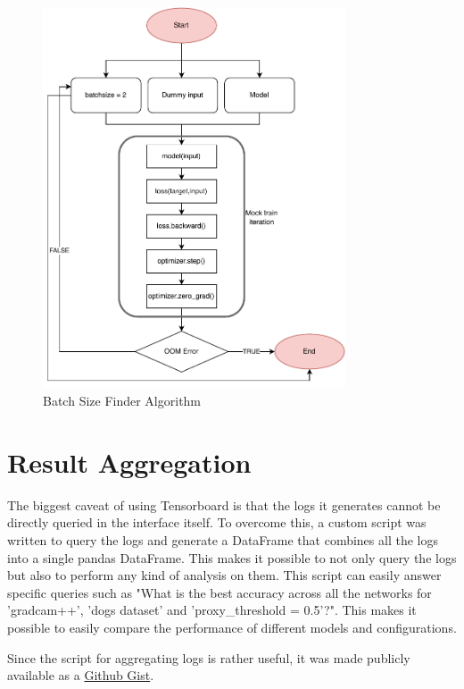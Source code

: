 \begin{figure}[H]
    \centering
    \includegraphics[width=0.8\textwidth]{images/batchsizefinder.pdf}
    \caption{Batch Size Finder Algorithm}
    \label{fig:bsfinder}
\end{figure}

\section{Result Aggregation} \label{sec:result_aggregation}
The biggest caveat of using Tensorboard is that the logs it generates cannot be directly queried in the interface itself. To overcome this, a custom script was written to query the logs and generate a DataFrame that combines all the logs into a single pandas DataFrame. This makes it possible to not only query the logs but also to perform any kind of analysis on them. This script can easily answer specific queries such as "What is the best accuracy across all the networks for 'gradcam++', 'dogs dataset' and 'proxy\_threshold = 0.5'?". This makes it possible to easily compare the performance of different models and configurations.

Since the script for aggregating logs is rather useful, it was made publicly available as a \href{https://gist.github.com/SubhadityaMukherjee/58cbdf324812175233e91993b720e0bc}{Github Gist}.


